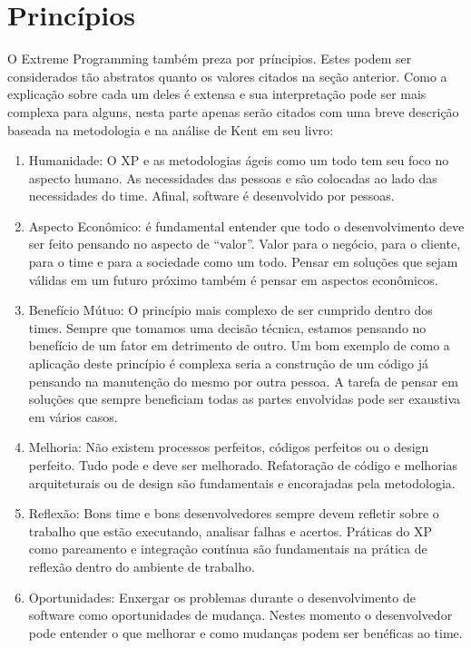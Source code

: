 \section{Princípios}

O Extreme Programming também preza por príncipios. Estes podem ser considerados tão abstratos quanto os valores citados na seção anterior. Como a explicação sobre cada um deles é extensa e sua interpretação pode ser mais complexa para alguns, nesta parte apenas serão citados com uma breve descrição baseada na metodologia e na análise de Kent em seu livro:

\begin{enumerate}

	\item Humanidade: O XP e as metodologias ágeis como um todo tem seu foco no aspecto humano. As necessidades das pessoas e são colocadas ao lado das necessidades do time. Afinal, software é desenvolvido por pessoas.

	\item Aspecto Econômico: é fundamental entender que todo o desenvolvimento deve ser feito pensando no aspecto de “valor”. Valor para o negócio, para o cliente, para o time e para a sociedade como um todo. Pensar em soluções que sejam válidas em um futuro próximo também é pensar em aspectos econômicos.

	\item Benefício Mútuo:  O princípio mais complexo de ser cumprido dentro dos times. Sempre que tomamos uma decisão técnica, estamos pensando no benefício de um fator em detrimento de outro. Um bom exemplo  de como a aplicação deste princípio é complexa seria a construção de um código já pensando na manutenção do mesmo por outra pessoa. A tarefa de pensar em soluções que sempre beneficiam todas as partes envolvidas pode ser exaustiva em vários casos.

	\item Melhoria:  Não existem processos perfeitos, códigos perfeitos ou o design perfeito. Tudo pode e deve ser melhorado. Refatoração de código e melhorias arquiteturais ou de design são fundamentais e encorajadas pela metodologia.

	\item Reflexão:   Bons time e bons desenvolvedores sempre devem refletir sobre o trabalho que estão executando, analisar falhas e acertos. Práticas do XP como pareamento e integração contínua são fundamentais na prática de reflexão dentro do ambiente de trabalho.

	\item Oportunidades: Enxergar os problemas durante o desenvolvimento de software como oportunidades de mudança. Nestes momento o desenvolvedor pode entender o que melhorar e como mudanças podem ser benéficas ao time.


\end{enumerate}
